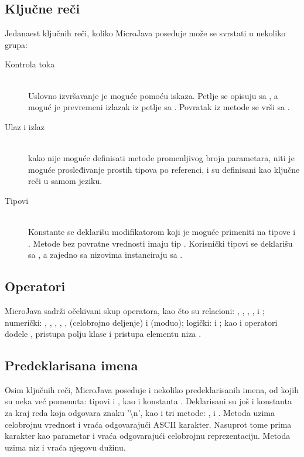 \subsection*{Ključne reči}

Jedanaest ključnih reči, koliko MicroJava poseduje može se svrstati u nekoliko grupa:

\begin{description}
    \item[Kontrola toka] \hfill \\
    Uslovno izvršavanje je moguće pomoću  iskaza. Petlje se opisuju sa , a moguć je prevremeni izlazak iz petlje sa . Povratak iz metode se vrši sa .

   \item[Ulaz i izlaz] \hfill \\
	kako nije moguće definisati metode promenljivog broja parametara, niti je moguće prosleđivanje prostih tipova po referenci,  i  su definisani kao ključne reči u samom jeziku.

	\item[Tipovi] \hfill \\
	Konstante se deklarišu modifikatorom  koji je moguće primeniti na tipove  i . Metode bez povratne vrednosti imaju tip . Korisnički tipovi se deklarišu sa , a zajedno sa nizovima instanciraju sa .

\end{description}


\subsection*{Operatori}

MicroJava sadrži očekivani skup operatora, kao čto su relacioni: \mj{<}, \mj{>}, \mj{==}, \mj{<=}, \mj{>=} i \mj{!=}; 
numerički: \mj{+}, \mj{++}, \mj{-}, \mj{--}, \mj{*}, \mj{/} (celobrojno deljenje) i \mj{\%} (moduo); 
logički: \mj{\&\&} i \mj{||}; 
kao i operatori dodele \mj{=}, pristupa polju klase  i pristupa elementu niza \mj{[]}.

\subsection*{Predeklarisana imena}

Osim ključnih reči, MicroJava poseduje i nekoliko predeklarisanih imena, od kojih su neka već pomenuta: tipovi  i , kao i konstanta . Deklarisani su još i konstanta za kraj reda  koja odgovara znaku '\textbackslash n', kao i tri metode: ,  i . Metoda   uzima celobrojnu vrednost i vraća odgovarajući ASCII karakter. Nasuprot tome  prima karakter kao parametar i vraća odgovarajući celobrojnu reprezentaciju. Metoda  uzima niz i vraća njegovu dužinu. 

